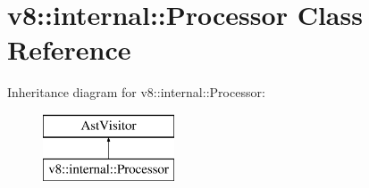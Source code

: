\hypertarget{classv8_1_1internal_1_1_processor}{}\section{v8\+:\+:internal\+:\+:Processor Class Reference}
\label{classv8_1_1internal_1_1_processor}
Inheritance diagram for v8\+:\+:internal\+:\+:Processor\+:\begin{figure}[H]
\begin{center}
\leavevmode
\includegraphics[height=2.000000cm]{classv8_1_1internal_1_1_processor}
\end{center}
\end{figure}
